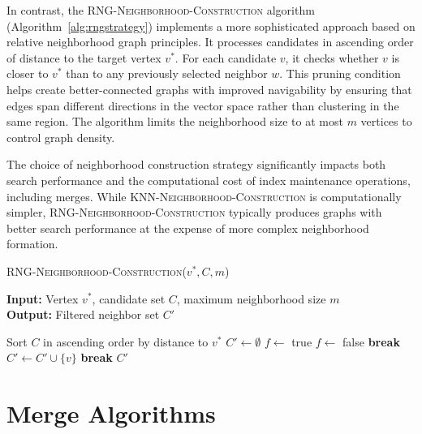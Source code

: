 \documentclass{article}
\begin{document}
In contrast, the \textsc{RNG-Neighborhood-Construction} algorithm (Algorithm~\ref{alg:rngstrategy}) implements a more sophisticated approach based on relative neighborhood graph principles. It processes candidates in ascending order of distance to the target vertex $v^*$. For each candidate $v$, it checks whether $v$ is closer to $v^*$ than to any previously selected neighbor $w$. This pruning condition helps create better-connected graphs with improved navigability by ensuring that edges span different directions in the vector space rather than clustering in the same region. The algorithm limits the neighborhood size to at most $m$ vertices to control graph density.

The choice of neighborhood construction strategy significantly impacts both search performance and the computational cost of index maintenance operations, including merges. While \textsc{KNN-Neighborhood-Construction} is computationally simpler, \textsc{RNG-Neighborhood-Construction} typically produces graphs with better search performance at the expense of more complex neighborhood formation.

\begin{algorithm}
\caption{\textsc{RNG-Neighborhood-Construction}($v^*, C, m$)}\label{alg:rngstrategy}
\textbf{Input:} Vertex $v^*$, candidate set $C$, maximum neighborhood size $m$ \\
\textbf{Output:} Filtered neighbor set $C'$
\begin{algorithmic}[1]
\State Sort $C$ in ascending order by distance to $v^*$
\State $C' \gets \emptyset$
    \State $f \gets$ true
            \State $f \gets$ false
            \State \textbf{break}
        \EndIf
    \EndFor
        \State $C' \gets C' \cup \{v\}$
    \EndIf
        \State \textbf{break}
    \EndIf
\EndFor
\State \Return $C'$
\end{algorithmic}
\end{algorithm}

\section{Merge Algorithms}
\end{document}
